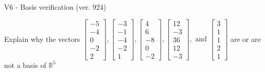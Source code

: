 \begin{exercise}
  \begin{exerciseTitle}V6 - Basis verification (ver. 924)\end{exerciseTitle}
  \begin{exerciseStatement}
    Explain why the vectors \(\left[\begin{array}{r}
-5 \\
-4 \\
0 \\
-2 \\
2
\end{array}\right] , \left[\begin{array}{r}
-3 \\
-1 \\
-4 \\
-2 \\
1
\end{array}\right] , \left[\begin{array}{r}
4 \\
6 \\
-8 \\
0 \\
-2
\end{array}\right] , \left[\begin{array}{r}
12 \\
-3 \\
36 \\
12 \\
-3
\end{array}\right] , \text{ and } \left[\begin{array}{r}
3 \\
1 \\
1 \\
2 \\
1
\end{array}\right]\) are or are not a basis of \(\mathbb{R}^5\)	



\end{exerciseStatement}
\end{exercise}
